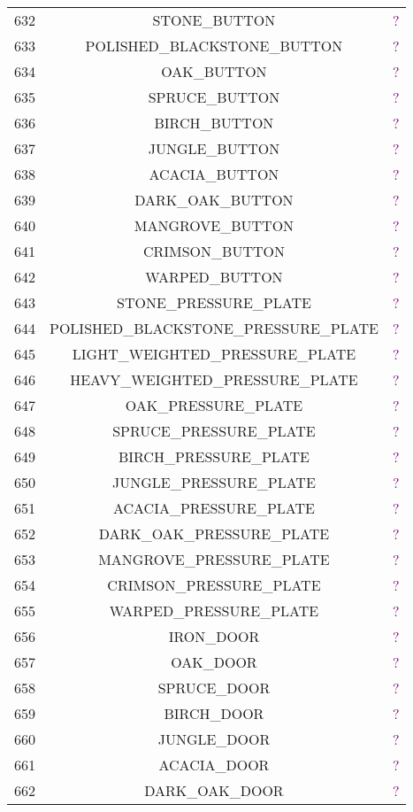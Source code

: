 \documentclass[11pt]{article}
\newcommand\myworries[1]{\textcolor{purple}{#1}}
\begin{document}
\begin{longtable}{ |c|c|c| }
	632 & STONE\_BUTTON & \myworries{?} \\
	633 & POLISHED\_BLACKSTONE\_BUTTON & \myworries{?} \\
	634 & OAK\_BUTTON & \myworries{?} \\
	635 & SPRUCE\_BUTTON & \myworries{?} \\
	636 & BIRCH\_BUTTON & \myworries{?} \\
	637 & JUNGLE\_BUTTON & \myworries{?} \\
	638 & ACACIA\_BUTTON & \myworries{?} \\
	639 & DARK\_OAK\_BUTTON & \myworries{?} \\
	640 & MANGROVE\_BUTTON & \myworries{?} \\
	641 & CRIMSON\_BUTTON & \myworries{?} \\
	642 & WARPED\_BUTTON & \myworries{?} \\
	643 & STONE\_PRESSURE\_PLATE & \myworries{?} \\
	644 & POLISHED\_BLACKSTONE\_PRESSURE\_PLATE & \myworries{?} \\
	645 & LIGHT\_WEIGHTED\_PRESSURE\_PLATE & \myworries{?} \\
	646 & HEAVY\_WEIGHTED\_PRESSURE\_PLATE & \myworries{?} \\
	647 & OAK\_PRESSURE\_PLATE & \myworries{?} \\
	648 & SPRUCE\_PRESSURE\_PLATE & \myworries{?} \\
	649 & BIRCH\_PRESSURE\_PLATE & \myworries{?} \\
	650 & JUNGLE\_PRESSURE\_PLATE & \myworries{?} \\
	651 & ACACIA\_PRESSURE\_PLATE & \myworries{?} \\
	652 & DARK\_OAK\_PRESSURE\_PLATE & \myworries{?} \\
	653 & MANGROVE\_PRESSURE\_PLATE & \myworries{?} \\
	654 & CRIMSON\_PRESSURE\_PLATE & \myworries{?} \\
	655 & WARPED\_PRESSURE\_PLATE & \myworries{?} \\
	656 & IRON\_DOOR & \myworries{?} \\
	657 & OAK\_DOOR & \myworries{?} \\
	658 & SPRUCE\_DOOR & \myworries{?} \\
	659 & BIRCH\_DOOR & \myworries{?} \\
	660 & JUNGLE\_DOOR & \myworries{?} \\
	661 & ACACIA\_DOOR & \myworries{?} \\
	662 & DARK\_OAK\_DOOR & \myworries{?} \\

\end{longtable}
\end{document}
